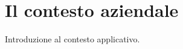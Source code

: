 

\chapter{Il contesto aziendale}
\label{cap:introduzione}

Introduzione al contesto applicativo. \\